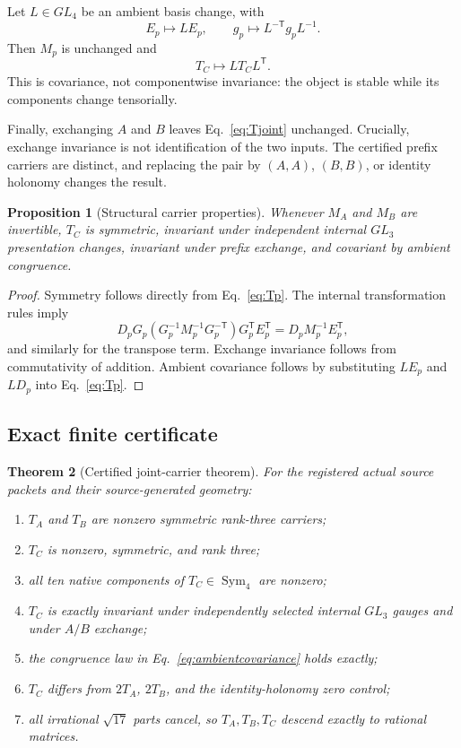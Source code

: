 \documentclass[11pt]{article}
\newtheorem{theorem}{Theorem}[section]
\newtheorem{proposition}[theorem]{Proposition}
\theoremstyle{definition}
\theoremstyle{remark}
\newcommand{\Sym}{\operatorname{Sym}}
\begin{document}
Let $L\in GL_4$ be an ambient basis change, with
\begin{equation}
 E_p\mapsto LE_p,\qquad g_p\mapsto L^{-\mathsf T}g_pL^{-1}.
\end{equation}
Then $M_p$ is unchanged and
\begin{equation}\label{eq:ambientcovariance}
 T_C\mapsto LT_CL^{\mathsf T}.
\end{equation}
This is covariance, not componentwise invariance: the object is stable while its components change tensorially.

Finally, exchanging $A$ and $B$ leaves Eq.~\eqref{eq:Tjoint} unchanged. Crucially, exchange invariance is not identification of the two inputs. The certified prefix carriers are distinct, and replacing the pair by $(A,A)$, $(B,B)$, or identity holonomy changes the result.

\begin{proposition}[Structural carrier properties]\label{prop:structural}
Whenever $M_A$ and $M_B$ are invertible, $T_C$ is symmetric, invariant under independent internal $GL_3$ presentation changes, invariant under prefix exchange, and covariant by ambient congruence.
\end{proposition}

\begin{proof}
Symmetry follows directly from Eq.~\eqref{eq:Tp}. The internal transformation rules imply
\[
 D_pG_p(G_p^{-1}M_p^{-1}G_p^{-\mathsf T})G_p^{\mathsf T}E_p^{\mathsf T}
 =D_pM_p^{-1}E_p^{\mathsf T},
\]
and similarly for the transpose term. Exchange invariance follows from commutativity of addition. Ambient covariance follows by substituting $LE_p$ and $LD_p$ into Eq.~\eqref{eq:Tp}.
\end{proof}

\subsection{Exact finite certificate}

\begin{theorem}[Certified joint-carrier theorem]\label{thm:x60}
For the registered actual source packets and their source-generated geometry:
\begin{enumerate}
\item $T_A$ and $T_B$ are nonzero symmetric rank-three carriers;
\item $T_C$ is nonzero, symmetric, and rank three;
\item all ten native components of $T_C\in\Sym_4$ are nonzero;
\item $T_C$ is exactly invariant under independently selected internal $GL_3$ gauges and under $A/B$ exchange;
\item the congruence law in Eq.~\eqref{eq:ambientcovariance} holds exactly;
\item $T_C$ differs from $2T_A$, $2T_B$, and the identity-holonomy zero control;
\item all irrational $\sqrt{17}$ parts cancel, so $T_A,T_B,T_C$ descend exactly to rational matrices.
\end{enumerate}
\end{theorem}
\end{document}

